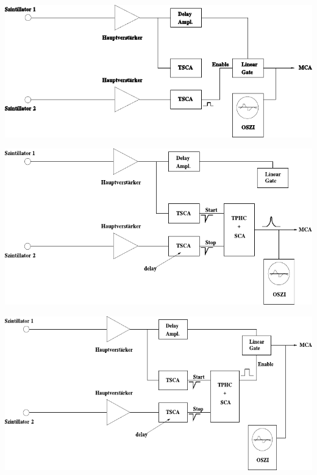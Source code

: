 %
\begin{center}
    \begin{adjustbox}{max width=\linewidth, keepaspectratio}
        \includegraphics[]{pdf/Schaltung4_mod}
    \end{adjustbox}
    \label{fig:Schaltung4}
\end{center}
%
\begin{center}
    \begin{adjustbox}{max width=\linewidth, keepaspectratio}
        \includegraphics[]{pdf/Schaltung5_mod}
    \end{adjustbox}
    \label{fig:Schaltung5}
\end{center}
%
\begin{center}
    \begin{adjustbox}{max width=\linewidth, keepaspectratio}
        \includegraphics[]{pdf/Schaltung6_mod}
    \end{adjustbox}
    \label{fig:Schaltung6}
\end{center}
%
